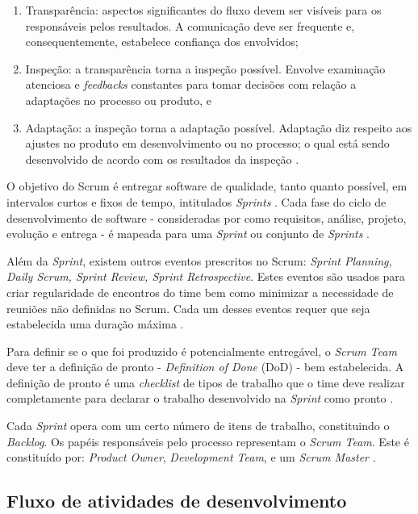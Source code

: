 \begin{enumerate}
    \item Transparência: aspectos significantes do fluxo devem ser visíveis para os responsáveis pelos resultados. A comunicação deve ser frequente e, consequentemente, estabelece confiança dos envolvidos;
    \item Inspeção: a transparência torna a inspeção possível. Envolve examinação atenciosa e \textit{feedbacks} constantes para tomar decisões com relação a adaptações no processo ou produto, e
    \item Adaptação: a inspeção torna a adaptação possível. Adaptação diz respeito aos ajustes no produto em desenvolvimento ou no processo; o qual está sendo desenvolvido de acordo com os resultados da inspeção \cite{rubin2012}.
\end{enumerate}

O objetivo do Scrum é entregar software de qualidade, tanto quanto possível, em intervalos curtos e fixos de tempo, intitulados \textit{Sprints} \cite{beedle1999}. Cada fase do ciclo de desenvolvimento de software - consideradas por  como requisitos, análise, projeto, evolução e entrega - é mapeada para uma \textit{Sprint} ou conjunto de \textit{Sprints} \cite{beedle1999}. 

Além da \textit{Sprint}, existem outros eventos prescritos no Scrum: \textit{Sprint Planning, Daily Scrum, Sprint Review, Sprint Retrospective}. Estes eventos são usados para criar regularidade de encontros do time bem como minimizar a necessidade de reuniões não definidas no Scrum. Cada um desses eventos requer que seja estabelecida uma duração máxima \cite{beedle1999}.

Para definir se o que foi produzido é potencialmente entregável, o \textit{Scrum Team} deve ter a definição de pronto - \textit{Definition of Done} (DoD) - bem estabelecida. A definição de pronto é uma \textit{checklist} de tipos de trabalho que o time deve realizar completamente para declarar o trabalho desenvolvido na \textit{Sprint} como pronto \cite{rubin2012}.

Cada \textit{Sprint} opera com um certo número de itens de trabalho, constituindo o \textit{Backlog}. Os papéis responsáveis pelo processo representam o \textit{Scrum Team}. Este é constituído por: \textit{Product Owner}, \textit{Development Team}, e um \textit{Scrum Master} \cite{beedle1999}.

\subsection{Fluxo de atividades de desenvolvimento}\label{sec:proc_ds}

